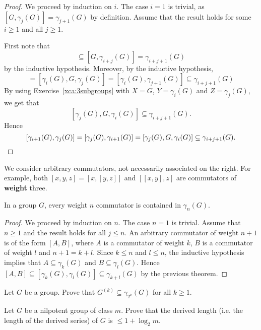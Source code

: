 \begin{proof}
We proceed by induction on $i$. The case $i=1$ is trivial, as
$[G,\gamma_j(G)]=\gamma_{j+1}(G)$ by definition. Assume that
the result holds for some $i\geq1$ and all $j\geq 1$. 
	
First note that 
\begin{equation*}
[G,\gamma_i(G),\gamma_j(G)]\subseteq [G,\gamma_{i+j}(G)]=\gamma_{i+j+1}(G)
\end{equation*}
by the inductive hypothesis. Moreover, by the inductive hypothesis, 
\begin{equation*}
[\gamma_i(G),\gamma_j(G),G]=[\gamma_i(G),G,\gamma_j(G)]=[\gamma_{i}(G),\gamma_{j+1}(G)]\subseteq \gamma_{i+j+1}(G)
\end{equation*}
By using Exercise~\ref{xca:3subgroups} with $X=G$, $Y=\gamma_i(G)$ and $Z=\gamma_j(G)$,
we get that 
\[
[\gamma_j(G),G,\gamma_i(G)]\subseteq \gamma_{i+j+1}(G).
\]
Hence  
\[
[\gamma_{i+1}(G),\gamma_{j}(G)]=[\gamma_{j}(G),\gamma_{i+1}(G)]=[\gamma_j(G),G,\gamma_i(G)]\subseteq \gamma_{i+j+1}(G).\qedhere
\]
\end{proof}

We consider arbitrary commutators, not necessarily associated on the right.   
For example, both $[x,y,z]=[x,[y,z]]$ and $[[x,y],z]$ are commutators of \textbf{weight} three. 

\begin{corollary}
In a group $G$, every weight $n$ commutator is contained in 
$\gamma_n(G)$.
\end{corollary}

\begin{proof}
We proceed by induction on $n$. The case $n=1$ is trivial. Assume that $n\geq1$ and 
the result holds for all $j\leq n$. An arbitrary commutator of weight $n+1$ 
is of the form $[A,B]$, where $A$ is a commutator of weight $k$,
$B$ is a commutator of weight $l$ and $n+1=k+l$. Since $k\leq n$ and $l\leq n$, 
the inductive hypothesis implies that  $A\subseteq \gamma_k(G)$ and $B\subseteq
\gamma_l(G)$. Hence $[A,B]\subseteq [\gamma_k(G),\gamma_l(G)]\subseteq
\gamma_{k+l}(G)$ by the previous theorem.
\end{proof}

\begin{exercise}
\label{xca:inclusion}
    Let $G$ be a group. Prove that $G^{(k)}\subseteq \gamma_{2^k}(G)$ for all $k\geq1$. 
\end{exercise}

\begin{exercise}
\label{xca:derived_length}
    Let $G$ be a nilpotent group of class $m$. Prove that
    the derived length (i.e. 
    the length of the derived series) of $G$ is $\leq 1+\log_2m$.
\end{exercise}


